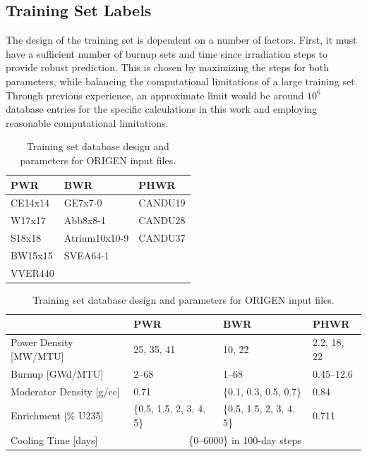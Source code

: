 \subsection{Training Set Labels}
\label{sec:snflbls}

The design of the training set is dependent on a number of factors.  First, it
must have a sufficient number of burnup sets and time since irradiation steps
to provide robust prediction. This is chosen by maximizing the steps for both
parameters, while balancing the computational limitations of a large training
set. Through previous experience, an approximate limit would be around $10^6$
database entries for the specific calculations in this work and employing
reasonable computational limitations.

\begin{table}[!htb]
  \centering
  \begin{subtable}{\linewidth}
    \centering
    \begin{tabular}{@{}lll@{}}
    \toprule
      \textbf{PWR} & \textbf{BWR}  & \textbf{PHWR} \\ \toprule
      CE14x14      & GE7x7-0       & CANDU19       \\
      W17x17       & Abb8x8-1      & CANDU28       \\
      S18x18       & Atrium10x10-9 & CANDU37       \\
      BW15x15      & SVEA64-1      &               \\
      VVER440      &               &               \\ \bottomrule
    \end{tabular}
    \caption{\gls{ORIGEN} designations for reactor technologies and fuel assembly design.}
    \label{tbl:rxtrtype}
    \vspace*{5mm}
  \end{subtable}
  \begin{subtable}{\linewidth}
    \centering
    \begin{tabular}{@{}llll@{}}
      \toprule
                                & \textbf{PWR}              & \textbf{BWR}              & \textbf{PHWR} \\ \toprule
      Power Density [MW/MTU]    & 25, 35, 41                & 10, 22                    & 2.2, 18, 22   \\
      Burnup [GWd/MTU]          & 2--68                     & 1--68                     & 0.45--12.6    \\
      Moderator Density [g/cc]  & 0.71                      & \{0.1, 0.3, 0.5, 0.7\}    & 0.84          \\
      Enrichment [\% \gls{U235}]& \{0.5, 1.5, 2, 3, 4, 5\}  & \{0.5, 1.5, 2, 3, 4, 5\}  & 0.711         \\
      Cooling Time [days]       & \multicolumn{3}{c}{\{0--6000\} in 100-day steps}                      \\ \bottomrule
    \end{tabular}
    \caption{Simulation parameters for \gls{ORIGEN} input files.}
    \label{tbl:rxtrparam}
  \end{subtable}%
  \caption{Training set database design and parameters for \gls{ORIGEN} input files.}
  \label{tbl:train}
\end{table}

